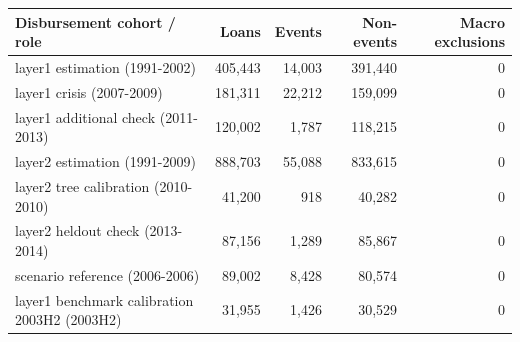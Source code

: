 \begingroup\small\setlength{\tabcolsep}{3pt}
\begin{tabularx}{\linewidth}{Xrrrr}\toprule
Disbursement cohort / role & Loans & Events & Non-events & Macro exclusions \\ \midrule
layer1 estimation (1991-2002) & 405,443 & 14,003 & 391,440 & 0 \\
layer1 crisis (2007-2009) & 181,311 & 22,212 & 159,099 & 0 \\
layer1 additional check (2011-2013) & 120,002 & 1,787 & 118,215 & 0 \\
layer2 estimation (1991-2009) & 888,703 & 55,088 & 833,615 & 0 \\
layer2 tree calibration (2010-2010) & 41,200 & 918 & 40,282 & 0 \\
layer2 heldout check (2013-2014) & 87,156 & 1,289 & 85,867 & 0 \\
scenario reference (2006-2006) & 89,002 & 8,428 & 80,574 & 0 \\
layer1 benchmark calibration 2003H2 (2003H2) & 31,955 & 1,426 & 30,529 & 0 \\
\bottomrule\end{tabularx}\endgroup
